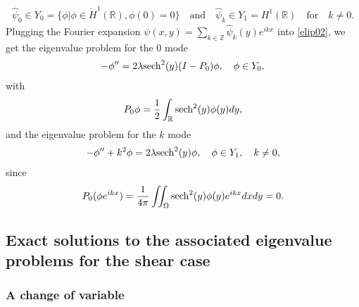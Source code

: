 \documentclass[1 [leqno, 11pt]{amsart}
\numberwithin{equation}{section}
\def\sech{{\rm{sech}}}
\begin{document}
\begin{CJK*}{GBK}{song}
\begin{align}
\widehat{\psi}_0 \in Y_0 = \{\phi | \phi \in \dot{H}^1(\mathbb{R}), \phi(0) = 0\}\quad\text{and}\quad\widehat{\psi}_{k} \in Y_1 =  H^1(\mathbb{R})\quad \text{for}\quad k\neq0.
\end{align}
Plugging the Fourier expansion $\psi(x,y)=\sum_{k\in\mathbb{Z}}\widehat{\psi}_{k}(y)e^{ik x}$ into \eqref{elip02}, we get the eigenvalue problem for the  $0$ mode
\begin{align}\label{mode0}
- \phi'' = 2\lambda \sech^2(y) (I - P_0) \phi, \quad \phi\in Y_0,
\end{align}
with $$P_0 \phi = \frac{1}{2} \int_{\mathbb{R}} \sech^2(y) \phi(y) dy,$$
and the eigenvalue problem for the  $k$ mode
\begin{align}\label{modek}
-  \phi'' + k^2 \phi = 2\lambda \sech^2(y)\phi, \quad \phi\in Y_1, \quad k \neq 0,
\end{align}
since $$P_0 (\phi e^{ikx}) =\frac{1}{4\pi} \iint_\Omega  \sech^2(y) \phi(y)e^{ikx} dxdy = 0.$$

\subsection{Exact solutions to the associated  eigenvalue problems for the shear case}
\subsubsection{A change of variable}\label{Change of variable}


\end{CJK*}
\end{document}
